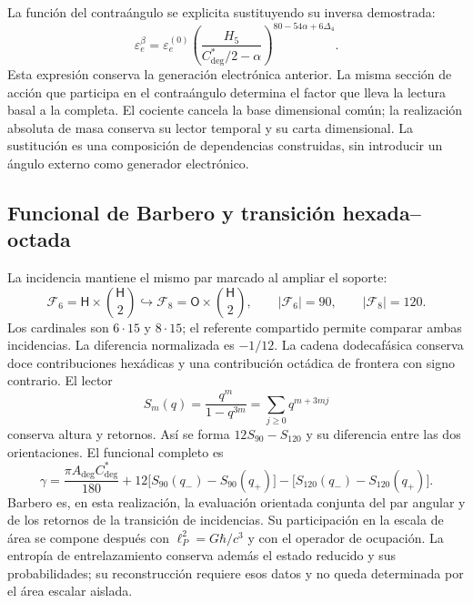 La función del contraángulo se explicita sustituyendo su inversa demostrada:
\begin{equation}
 \boxed{\varepsilon_e^\beta=\varepsilon_e^{(0)}
 \left(\frac{H_5}{C^*_{\deg}/2-\alpha}\right)^{80-54\alpha+6\Delta_4}.}
 \label{md:compos:electron-contraangulo}
\end{equation}
Esta expresión conserva la generación electrónica anterior. La misma
sección de acción que participa en el contraángulo determina el factor que
lleva la lectura basal a la completa. El cociente cancela la base dimensional
común; la realización absoluta de masa conserva su lector temporal y su carta
dimensional. La sustitución es una composición de dependencias construidas,
sin introducir un ángulo externo como generador electrónico.

\subsection{Funcional de Barbero y transición hexada--octada}
\label{md:compos:barbero}

La incidencia mantiene el mismo par marcado al ampliar el soporte:
\begin{equation}
 \mathcal F_6=\mathsf H\times\binom{\mathsf H}{2}
 \hookrightarrow
 \mathcal F_8=\mathsf O\times\binom{\mathsf H}{2},
 \qquad |\mathcal F_6|=90,\qquad |\mathcal F_8|=120.
 \label{md:compos:incidencia}
\end{equation}
Los cardinales son $6\cdot15$ y $8\cdot15$; el referente compartido permite
comparar ambas incidencias. La diferencia normalizada es $-1/12$. La cadena
dodecafásica conserva doce contribuciones hexádicas y una contribución
octádica de frontera con signo contrario. El lector
\begin{equation}
 S_m(q)=\frac{q^m}{1-q^{3m}}
 =\sum_{j\geq0}q^{m+3mj}
 \label{md:compos:serie-retorno}
\end{equation}
conserva altura y retornos. Así se forma $12S_{90}-S_{120}$ y su diferencia
entre las dos orientaciones. El funcional completo es
\begin{equation}
 \gamma=\frac{\pi A_{\deg}C^*_{\deg}}{180}
 +12\bigl[S_{90}(q_-)-S_{90}(q_+)\bigr]
 -\bigl[S_{120}(q_-)-S_{120}(q_+)\bigr].
 \label{md:compos:funcional-barbero}
\end{equation}
Barbero es, en esta realización, la evaluación orientada conjunta del par
angular y de los retornos de la transición de incidencias. Su participación
en la escala de área se compone después con $\ell_P^2=G\hbar/c^3$ y con el
operador de ocupación. La entropía de entrelazamiento conserva además el
estado reducido y sus probabilidades; su reconstrucción requiere esos datos
y no queda determinada por el área escalar aislada.

